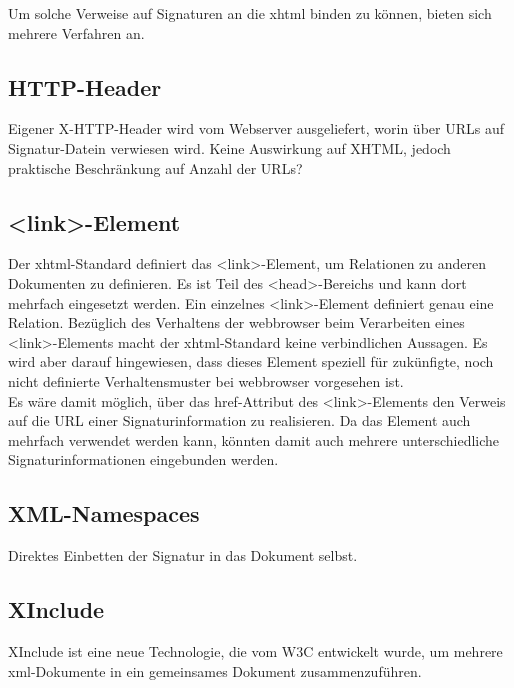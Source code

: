Um solche Verweise auf Signaturen an die \gls{xhtml} binden zu können, bieten sich mehrere Verfahren an.

\subsection{HTTP-Header}
Eigener X-HTTP-Header wird vom Webserver ausgeliefert, worin über URLs auf Signatur-Datein verwiesen wird. Keine Auswirkung auf XHTML, jedoch praktische Beschränkung
auf Anzahl der URLs?

\subsection{<link>-Element}
Der \gls{xhtml}-Standard definiert das <link>-Element, um Relationen zu anderen Dokumenten zu definieren\cite{xhtml:oreilly}. Es ist Teil des <head>-Bereichs und kann dort mehrfach
eingesetzt werden. Ein einzelnes <link>-Element definiert genau eine Relation. Bezüglich des Verhaltens der \gls{webbrowser} beim Verarbeiten eines
<link>-Elements macht der \gls{xhtml}-Standard keine verbindlichen Aussagen. Es wird aber darauf hingewiesen, dass dieses Element speziell für zukünfigte, noch
nicht definierte Verhaltensmuster bei \Gls{webbrowser} vorgesehen ist.\\

Es wäre damit möglich, über das href-Attribut des <link>-Elements den Verweis auf die URL einer Signaturinformation zu realisieren. Da das Element auch mehrfach
verwendet werden kann, könnten damit auch mehrere unterschiedliche Signaturinformationen eingebunden werden.

\subsection{XML-Namespaces}
Direktes Einbetten der Signatur in das Dokument selbst.

\subsection{XInclude}
XInclude ist eine neue Technologie, die vom W3C entwickelt wurde, um mehrere \gls{xml}-Dokumente in ein gemeinsames Dokument
zusammenzuführen\cite{xml:oreilly}.
